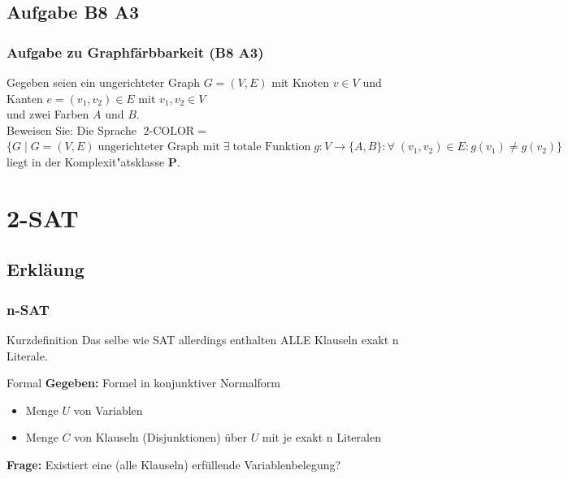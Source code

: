 \subsection{Aufgabe B8 A3}
\begin{frame}
	\frametitle{Aufgabe zu Graphfärbbarkeit (B8 A3)}
	Gegeben seien ein ungerichteter Graph $G = (V,E)$ mit Knoten $v \in V$ und
	Kanten $e = (v_1,v_2) \in E$ mit $v_1, v_2 \in V$\\ und zwei Farben $A$ und $B$.\\
	Beweisen Sie: Die Sprache $\mbox{2-COLOR} \; =$\\
	$\{G \; | \; G = (V,E) \; \mbox{ungerichteter Graph mit} \; \exists \; \mbox{totale
	Funktion} \; g: V \to \{A,B\}: \forall \; (v_1, v_2) \in E: g(v_1) \neq g(v_2)\}$\\
	liegt in der Komplexit"atsklasse \textbf{P}.
\end{frame}

\section{2-SAT}
\subsection{Erkläung}
\begin{frame}
	\frametitle{n-SAT}
	\begin{block}{Kurzdefinition}
	Das selbe wie SAT allerdings enthalten ALLE Klauseln exakt n Literale.\\
	\end{block}
	\begin{block}{Formal}
\textbf{Gegeben:} Formel in konjunktiver Normalform
\begin{itemize}
 \item Menge $U$ von Variablen
 \item Menge $C$ von Klauseln (Disjunktionen) über $U$ mit je exakt n Literalen
\end{itemize} %

\textbf{Frage:} Existiert eine (alle Klauseln) erfüllende Variablenbelegung?
\end{block}

\end{frame}
